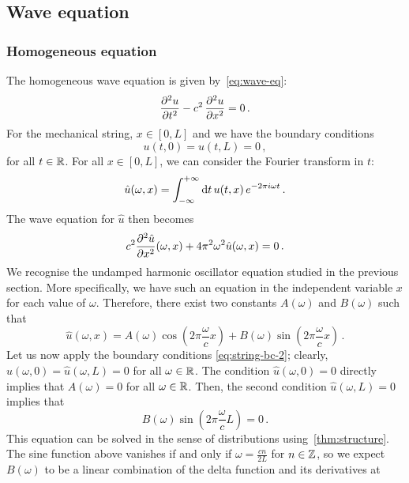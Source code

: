\subsection{Wave equation}
\subsubsection{Homogeneous equation}
The homogeneous wave equation is given by~\cref{eq:wave-eq}:
\begin{equation}
  \frac{\partial^{2} u}{\partial t^{2}}-c^2\,\frac{\partial^{2} u}{\partial x^{2}}=0\,.
\end{equation}
For the mechanical string, $x\in[0,L]$ and we have the boundary conditions
\begin{equation}
  u(t,0)=u(t,L)=0\,,
  \label{eq:string-bc-2}
\end{equation}
for all $t\in\mathbb{R}$. For all $x\in[0,L]$, we can consider the Fourier transform in $t$:
\begin{equation}
  \hat{u}(\omega,x)=\int_{-\infty}^{+\infty}\mathrm{d}{t}\,u(t,x)\,e^{-2\pi i\omega t}\,.
\end{equation}
The wave equation for $\hat{u}$ then becomes
\begin{equation}
  c^2\frac{\partial^{2} \hat{u}}{\partial x^{2}}(\omega,x)+4\pi^2\omega^2\hat{u}(\omega,x)=0\,.
\end{equation}
We recognise the undamped harmonic oscillator equation studied in the previous section.
More specifically, we have such an equation in the independent variable $x$ for each value
of $\omega$. Therefore, there exist two constants $A(\omega)$ and $B(\omega)$ such that
\begin{equation}
  \hat{u}(\omega,x)=A(\omega)\cos\left(2\pi\frac{\omega}{c}x\right)+
  B(\omega)\sin\left(2\pi\frac{\omega}{c}x\right)\,.
\end{equation}
Let us now apply the boundary conditions \cref{eq:string-bc-2}; clearly,
$\hat{u}(\omega,0)=\hat{u}(\omega,L)=0$ for all $\omega\in\mathbb{R}$. The condition
$\hat{u}(\omega,0)=0$ directly implies that $A(\omega)=0$ for all $\omega\in\mathbb{R}$. Then, the
second condition $\hat{u}(\omega,L)=0$ implies that
\begin{equation}
  B(\omega)\sin\left(2\pi\frac{\omega}{c}L\right)=0\,.
\end{equation}
This equation can be solved in the sense of distributions using~\cref{thm:structure}. The
sine function above vanishes if and only if $\omega=\frac{cn}{2L}$ for $n\in\mathbb{Z}$, so we
expect $B(\omega)$ to be a linear combination of the delta function and its derivatives at
